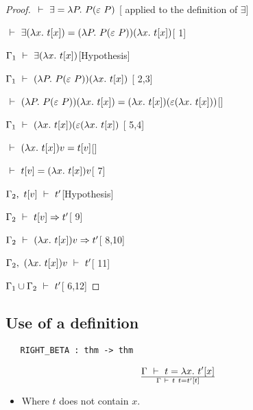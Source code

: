 \vspace{12pt plus2pt minus1pt}

\begin{proof}
\item $\ \vdash\  \exists = \lambda P.\  P(\varepsilon\ P)$\hfill
[ applied to the definition of $\exists$]
\item $\ \vdash\ \exists(\lambda x.\ t[x]) = 
(\lambda P.\ P(\varepsilon\ P))(\lambda x.\ t[x])$\hfill [ 1]
\item $\Gamma_1\ \vdash\ \exists(\lambda x.\ t[x])$\hfill [Hypothesis]
\item $\Gamma_1\turn (\lquant{P}P(\hilbert\ P))(\lquant{x}t[x])$
\hfill [ 2,3]
\item $\turn(\lquant{P}P(\hilbert\ P))(\lquant{x}t[x]) =
(\lquant{x}t[x])(\hilbert(\lquant{x}t[x]))$\hfill []
\item $\Gamma_1\ \vdash\ (\lambda x.\ t[x])(\varepsilon(\lambda x.\ t[x])$\hfill
[ 5,4]
\item $\ \vdash\ (\lambda x.\ t[x])v = t[v]$\hfill []
\item $\ \vdash\  t[v] =(\lambda x.\ t[x])v$\hfill [ 7]
\item $\Gamma_2,\ t[v]\ \vdash\  t'$\hfill [Hypothesis]
\item $\Gamma_2\ \vdash\  t[v]\Rightarrow t'$\hfill [ 9]
\item $\Gamma_2\ \vdash\ (\lambda x.\ t[x])v\Rightarrow t'$\hfill [ 8,10]
\item $\Gamma_2,\ (\lambda x.\ t[x])v\ \vdash\  t'$\hfill [ 11]
\item $\Gamma_1\cup\Gamma_2\ \vdash\  t'$\hfill [ 6,12]
\end{proof}

\subsection{Use of a definition}

\begin{boxed}
\begin{verbatim}
   RIGHT_BETA : thm -> thm
\end{verbatim}\end{boxed}

\vspace{12pt plus2pt minus1pt}

$$\Gamma\ \vdash\  t = \lambda x.\ t'[x]
\over \Gamma\ \vdash\  t\ t = t'[t]$$
\begin{itemize}
\item Where  $t$ does not contain $x$.
\end{itemize}

